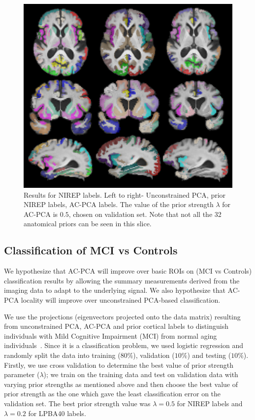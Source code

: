 \documentclass{llncs}
\begin{document}
{\begin{figure}
\begin{center}
\includegraphics[width=0.7\linewidth]{nirep.pdf} 
\end{center}
\vspace{-0.2in}
\caption{Results for NIREP labels. Left to right- Unconstrained PCA, prior NIREP labels, AC-PCA labels. The value of the prior strength $\lambda$ for AC-PCA is $0.5$, chosen on validation set. Note that not all the 32 anatomical priors can be seen in this slice.}
\label{fig:priornirep}
\end{figure}


\subsection{Classification of MCI vs Controls}

We hypothesize that AC-PCA will improve over basic ROIs on (MCI vs Controls) classification results by allowing the summary
measurements derived from the imaging data to adapt to the underlying signal.  We also hypothesize that AC-PCA locality will improve over
unconstrained PCA-based classification.

We use the projections (eigenvectors projected onto the data matrix) resulting from unconstrained PCA, AC-PCA and prior cortical labels to distinguish individuals with Mild Cognitive Impairment (MCI) from normal aging individuals~\cite{Zhou2011,Chen2010}. 
Since it is a classification problem, we used logistic regression and randomly split the data into training ($80\%$), validation ($10\%$) and testing ($10\%$). Firstly, we use cross validation to determine the best value of prior strength parameter ($\lambda$); we train on the training data and test on validation data with varying prior strengths as mentioned above and then choose the best value of prior strength as the one which gave the least classification error on the validation set.  The best prior strength value was $\lambda =0.5$ for NIREP labels and $\lambda=0.2$ for LPBA40 labels. 

}
\end{document}
